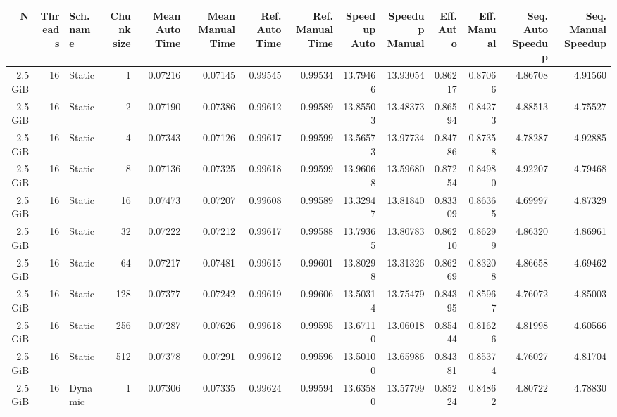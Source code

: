         \begin{table}[H]
            \centering
            \begin{adjustbox}{width=\textwidth, keepaspectratio}
                \begin{tabular}{rrlrrrrrrrrrrr}
                    \toprule
                    N & Threads & Sch. name & Chunk size & Mean Auto Time & Mean Manual Time & Ref. Auto Time & Ref. Manual Time & Speedup Auto & Speedup Manual & Eff. Auto & Eff. Manual & Seq. Auto Speedup & Seq. Manual Speedup \\
                    \midrule
                    2.5 GiB & 16 & Static & 1 & 0.07216 & 0.07145 & 0.99545 & 0.99534 & 13.79466 & 13.93054 & 0.86217 & 0.87066 & 4.86708 & 4.91560 \\
                    2.5 GiB & 16 & Static & 2 & 0.07190 & 0.07386 & 0.99612 & 0.99589 & 13.85503 & 13.48373 & 0.86594 & 0.84273 & 4.88513 & 4.75527 \\
                    2.5 GiB & 16 & Static & 4 & 0.07343 & 0.07126 & 0.99617 & 0.99599 & 13.56573 & 13.97734 & 0.84786 & 0.87358 & 4.78287 & 4.92885 \\
                    2.5 GiB & 16 & Static & 8 & 0.07136 & 0.07325 & 0.99618 & 0.99599 & 13.96068 & 13.59680 & 0.87254 & 0.84980 & 4.92207 & 4.79468 \\
                    2.5 GiB & 16 & Static & 16 & 0.07473 & 0.07207 & 0.99608 & 0.99589 & 13.32947 & 13.81840 & 0.83309 & 0.86365 & 4.69997 & 4.87329 \\
                    2.5 GiB & 16 & Static & 32 & 0.07222 & 0.07212 & 0.99617 & 0.99588 & 13.79365 & 13.80783 & 0.86210 & 0.86299 & 4.86320 & 4.86961 \\
                    2.5 GiB & 16 & Static & 64 & 0.07217 & 0.07481 & 0.99615 & 0.99601 & 13.80298 & 13.31326 & 0.86269 & 0.83208 & 4.86658 & 4.69462 \\
                    2.5 GiB & 16 & Static & 128 & 0.07377 & 0.07242 & 0.99619 & 0.99606 & 13.50314 & 13.75479 & 0.84395 & 0.85967 & 4.76072 & 4.85003 \\
                    2.5 GiB & 16 & Static & 256 & 0.07287 & 0.07626 & 0.99618 & 0.99595 & 13.67110 & 13.06018 & 0.85444 & 0.81626 & 4.81998 & 4.60566 \\
                    2.5 GiB & 16 & Static & 512 & 0.07378 & 0.07291 & 0.99612 & 0.99596 & 13.50100 & 13.65986 & 0.84381 & 0.85374 & 4.76027 & 4.81704 \\
                    2.5 GiB & 16 & Dynamic & 1 & 0.07306 & 0.07335 & 0.99624 & 0.99594 & 13.63580 & 13.57799 & 0.85224 & 0.84862 & 4.80722 & 4.78830 \\

\end{tabular}
\end{adjustbox}
\end{table}
